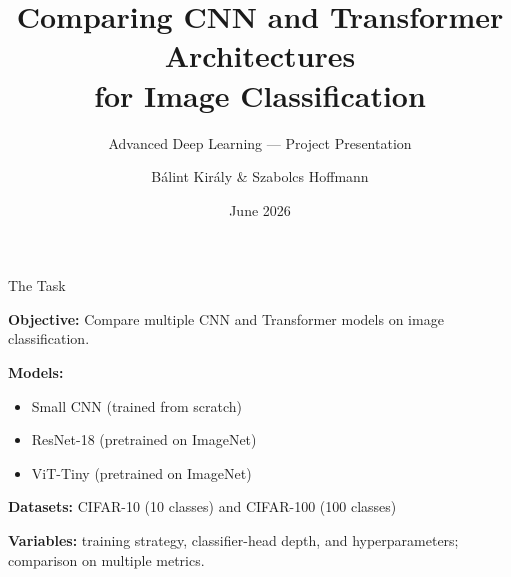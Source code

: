\documentclass{beamer}
\title[CNN vs Transformer]{Comparing CNN and Transformer Architectures\\for Image Classification}
\subtitle{Advanced Deep Learning --- Project Presentation}
\author[B.~Kir\'{a}ly \& Sz.~Hoffmann]{B\'{a}lint Kir\'{a}ly \& Szabolcs Hoffmann}
\institute{E\"{o}tv\"{o}s Lor\'{a}nd University}
\date{June 2026}
\begin{document}
\begin{frame}
  \titlepage
\end{frame}

\begin{frame}{The Task}

  \textbf{Objective:} Compare multiple CNN and Transformer models on image classification.

  \bigskip
  \textbf{Models:}
  \begin{itemize}
    \item Small CNN (trained from scratch)
    \item ResNet-18 (pretrained on ImageNet)
    \item ViT-Tiny (pretrained on ImageNet)
  \end{itemize}

  \bigskip
  \textbf{Datasets:} CIFAR-10 (10 classes) and CIFAR-100 (100 classes)

  \bigskip
  \textbf{Variables:} training strategy, classifier-head depth, and hyperparameters;
  comparison on multiple metrics.


\end{frame}
\end{document}
